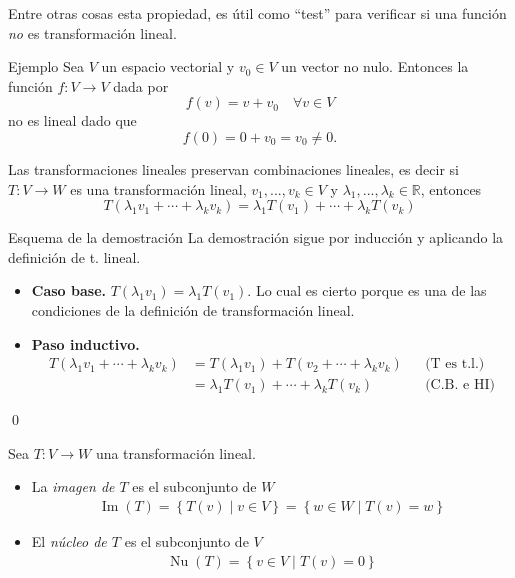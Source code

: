 \documentclass[handout]{beamer} %
\newcommand{\img}{\operatorname{Im}}
\renewcommand\nu{\operatorname{Nu}}
\newcommand{\R}{\mathbb R}
\begin{document}
\begin{frame}

Entre otras cosas esta propiedad, es útil como ``test'' para verificar si una función \textit{no} es transformación lineal. 
\pause
\
\begin{exampleblock}{Ejemplo}
Sea $V$ un espacio vectorial y $v_0\in V$ un vector no nulo. Entonces la función $f:V\longrightarrow V$ dada por 
$$
f(v)=v+v_0\quad\forall v\in V
$$
no es lineal dado que
$$
f(0)=0+v_0=v_0\neq0.
$$
\end{exampleblock}


\end{frame}

\begin{frame}
\begin{observacion}
Las transformaciones lineales preservan combinaciones lineales, es decir si $T:V\longrightarrow W$ es una transformación lineal, $v_1, ..., v_k\in V$ y $\lambda_1, ..., \lambda_k\in\R$, entonces
$$
T(\lambda_1v_1+\cdots+\lambda_kv_k)=\lambda_1T(v_1)+\cdots+\lambda_kT(v_k)
$$
\end{observacion}\pause
\begin{block}{Esquema de la demostración}\pause
    La demostración sigue por inducción y aplicando la definición de t. lineal. 
\begin{itemize}
    \item \textbf{Caso base.}  $T(\lambda_1v_1)=\lambda_1T(v_1)$. Lo cual es cierto porque es una de las condiciones de la definición de transformación lineal.
    \item \textbf{Paso inductivo.} 
    \begin{align*}
        T(\lambda_1v_1+\cdots+\lambda_kv_k) &= T(\lambda_1v_1)+T(v_2+\cdots+\lambda_kv_k)&&\text{(T es t.l.)}\\
        &=  \lambda_1T(v_1)+\cdots+\lambda_kT(v_k)&&\text{(C.B. e HI)}
    \end{align*}
\end{itemize}
\qed
\end{block}

\end{frame}




\begin{frame}
\begin{definicion}
Sea $T:V\longrightarrow W$ una transformación lineal.
\begin{itemize}\pause
\item La \textit{imagen de $T$} es el subconjunto de $W$
 \begin{align*}
 \img(T)=\left\{T(v)\mid v\in V\right\}=\left\{w\in W\mid T(v)=w\right\}
 \end{align*}\pause
 \item El \textit{núcleo de $T$} es el subconjunto de $V$
 \begin{align*}
 \nu(T)=\left\{v\in V\mid T(v)=0\right\}
 \end{align*}
\end{itemize}
\end{definicion}
\end{frame}
\end{document}
